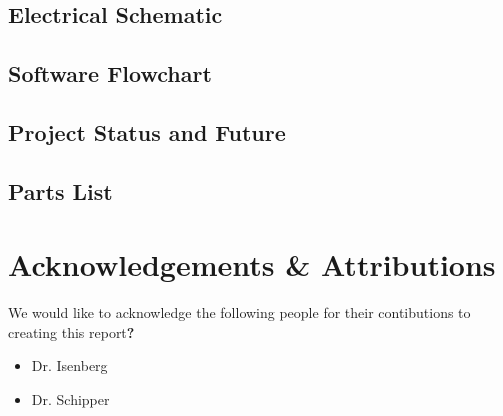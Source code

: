 \documentclass[12pt]{report}
\begin{document}
\subsection{Electrical Schematic}
\subsection{Software Flowchart}
\subsection{Project Status and Future}
\subsection{Parts List}





% 
% 

\newpage
\section*{Acknowledgements \& Attributions}
We would like to acknowledge the following people for their contibutions to creating this report\textbf{?}
\begin{itemize}
  \item Dr. Isenberg
  \item Dr. Schipper
\end{itemize}
\end{document}
